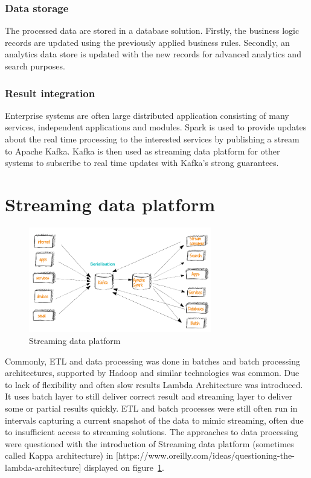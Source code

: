 \documentclass[a4paper, 10 pt, conference]{IEEEtran}
\begin{document}
\subsubsection{Data storage}
The processed data are stored in a database solution. Firstly, the business logic records are updated using the previously applied business rules. Secondly, an analytics data store is updated with the new records for advanced analytics and search purposes. 

\subsubsection{Result integration}
Enterprise systems are often large distributed application consisting of many services, independent applications and modules. Spark is used to provide updates about the real time processing to the interested services by publishing a stream to Apache Kafka. Kafka is then used as streaming data platform for other systems to subscribe to real time updates with Kafka's strong guarantees.

\section{Streaming data platform}

\begin{figure}[hb]
	\begin{center}
		\caption{Streaming data platform}
		\label{fig:streamingDataPlatform}
		\includegraphics[width=8cm,keepaspectratio]{streaming-data-platform.png}
	\end{center}
\end{figure}

Commonly, ETL and data processing was done in batches and batch processing architectures, supported by Hadoop and similar technologies was common. Due to lack of flexibility and often slow results Lambda Architecture was introduced. It uses batch layer to still deliver correct result and streaming layer to deliver some or partial results quickly.
ETL and batch processes were still often run in intervals capturing a current snapshot of the data to mimic streaming, often due to insufficient access to streaming solutions. The approaches to data processing were questioned with the introduction of Streaming data platform (sometimes called Kappa architecture) in [https://www.oreilly.com/ideas/questioning-the-lambda-architecture] displayed on figure~\ref{fig:streamingDataPlatform}.
\end{document}
